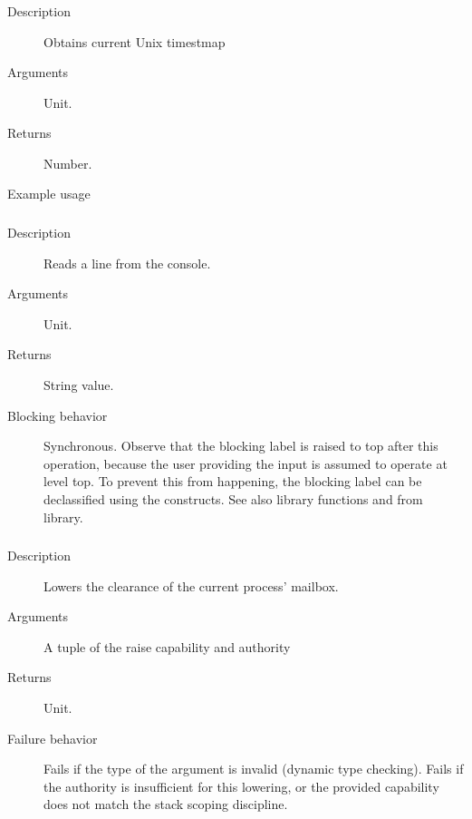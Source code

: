 \subsubsection{}
\begin{description}
    \item [Description] Obtains current Unix timestmap
    \item [Arguments] Unit.
    \item [Returns] Number. 
    \item [Example usage] 
\end{description}


\subsubsection{}
\begin{description}
\item[Description] Reads a  line from the console.
\item[Arguments] Unit.
\item[Returns] String value.
\item[Blocking behavior] Synchronous. Observe that the blocking label 
is raised to top after this operation, because the user providing the 
input is assumed to operate at level top. To prevent this from happening,
the blocking label can be declassified using the  constructs.
See also library functions  and 
from  library.
\end{description}


\subsubsection{}
\begin{description}
    \item [Description] Lowers the clearance of the current process' mailbox. 
    \item [Arguments] A tuple of the raise capability and authority 
    \item [Returns] Unit. 
    \item [Failure behavior] Fails if the type of the argument is invalid (dynamic type checking). Fails if the authority is insufficient for this lowering, or the provided capability does not match the stack scoping discipline. 
\end{description}


